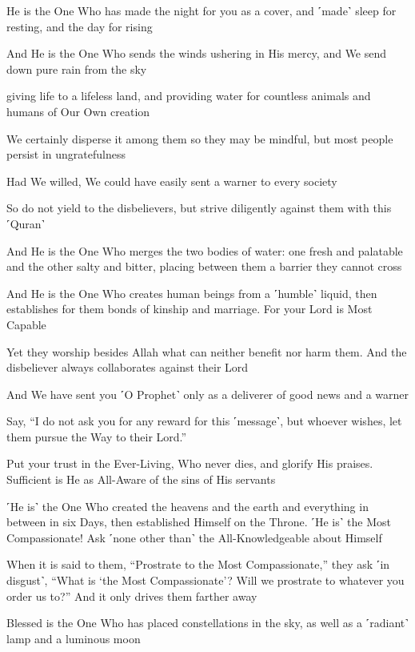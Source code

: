 He is the One Who has made the night for you as a cover, and ˹made˺ sleep for resting, and the day for rising

And He is the One Who sends the winds ushering in His mercy, and We send down pure rain from the sky

giving life to a lifeless land, and providing water for countless animals and humans of Our Own creation

We certainly disperse it among them so they may be mindful, but most people persist in ungratefulness

Had We willed, We could have easily sent a warner to every society

So do not yield to the disbelievers, but strive diligently against them with this ˹Quran˺

And He is the One Who merges the two bodies of water: one fresh and palatable and the other salty and bitter, placing between them a barrier they cannot cross

And He is the One Who creates human beings from a ˹humble˺ liquid, then establishes for them bonds of kinship and marriage. For your Lord is Most Capable

Yet they worship besides Allah what can neither benefit nor harm them. And the disbeliever always collaborates against their Lord

And We have sent you ˹O Prophet˺ only as a deliverer of good news and a warner

Say, “I do not ask you for any reward for this ˹message˺, but whoever wishes, let them pursue the Way to their Lord.”

Put your trust in the Ever-Living, Who never dies, and glorify His praises. Sufficient is He as All-Aware of the sins of His servants

˹He is˺ the One Who created the heavens and the earth and everything in between in six Days, then established Himself on the Throne. ˹He is˺ the Most Compassionate! Ask ˹none other than˺ the All-Knowledgeable about Himself

When it is said to them, “Prostrate to the Most Compassionate,” they ask ˹in disgust˺, “What is ‘the Most Compassionate’? Will we prostrate to whatever you order us to?” And it only drives them farther away

Blessed is the One Who has placed constellations in the sky, as well as a ˹radiant˺ lamp and a luminous moon

